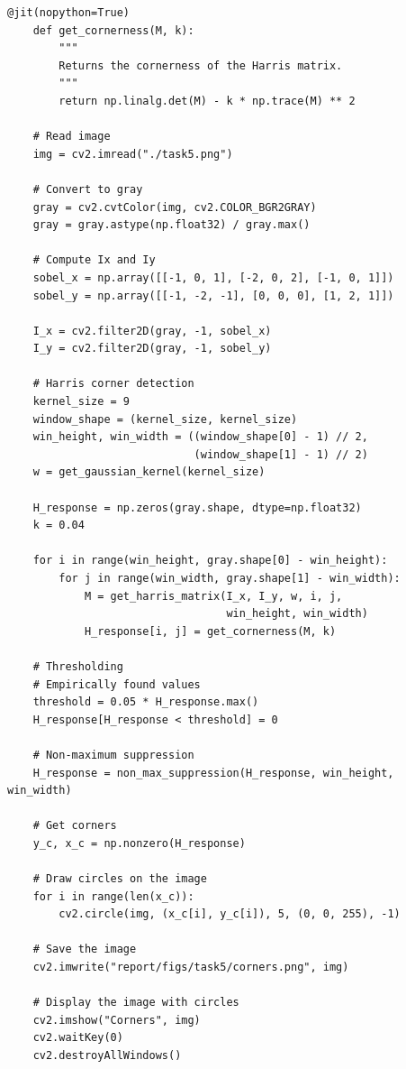 \documentclass[11pt,a4paper]{article}
\begin{document}
\begin{lstlisting}[language=iPython, title=Python Code for Corner Detection]
    @jit(nopython=True)
    def get_cornerness(M, k):
        """
        Returns the cornerness of the Harris matrix.
        """
        return np.linalg.det(M) - k * np.trace(M) ** 2
    
    # Read image
    img = cv2.imread("./task5.png")
    
    # Convert to gray
    gray = cv2.cvtColor(img, cv2.COLOR_BGR2GRAY)
    gray = gray.astype(np.float32) / gray.max()
    
    # Compute Ix and Iy
    sobel_x = np.array([[-1, 0, 1], [-2, 0, 2], [-1, 0, 1]])
    sobel_y = np.array([[-1, -2, -1], [0, 0, 0], [1, 2, 1]])
    
    I_x = cv2.filter2D(gray, -1, sobel_x)
    I_y = cv2.filter2D(gray, -1, sobel_y)
    
    # Harris corner detection
    kernel_size = 9
    window_shape = (kernel_size, kernel_size)
    win_height, win_width = ((window_shape[0] - 1) // 2,
                             (window_shape[1] - 1) // 2)
    w = get_gaussian_kernel(kernel_size)

    H_response = np.zeros(gray.shape, dtype=np.float32)
    k = 0.04
    
    for i in range(win_height, gray.shape[0] - win_height):
        for j in range(win_width, gray.shape[1] - win_width):
            M = get_harris_matrix(I_x, I_y, w, i, j,
                                  win_height, win_width)
            H_response[i, j] = get_cornerness(M, k)
    
    # Thresholding
    # Empirically found values
    threshold = 0.05 * H_response.max()
    H_response[H_response < threshold] = 0
    
    # Non-maximum suppression
    H_response = non_max_suppression(H_response, win_height, win_width)
    
    # Get corners
    y_c, x_c = np.nonzero(H_response)
    
    # Draw circles on the image
    for i in range(len(x_c)):
        cv2.circle(img, (x_c[i], y_c[i]), 5, (0, 0, 255), -1)
    
    # Save the image
    cv2.imwrite("report/figs/task5/corners.png", img)
    
    # Display the image with circles
    cv2.imshow("Corners", img)
    cv2.waitKey(0)
    cv2.destroyAllWindows()
\end{lstlisting}
\end{document}
